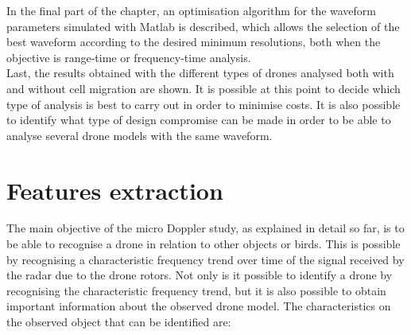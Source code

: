 In the final part of the chapter, an optimisation algorithm for the waveform parameters simulated with Matlab is described, which allows the selection of the best waveform according to the desired minimum resolutions, both when the objective is range-time or frequency-time analysis.\\
Last, the results obtained with the different types of drones analysed both with and without cell migration are shown. It is possible at this point to decide which type of analysis is best to carry out in order to minimise costs. It is also possible to identify what type of design compromise can be made in order to be able to analyse several drone models with the same waveform.

\section{Features extraction}
The main objective of the micro Doppler study, as explained in detail so far, is to be able to recognise a drone in relation to other objects or birds. This is possible by recognising a characteristic frequency trend over time of the signal received by the radar due to the drone rotors. Not only is it possible to identify a drone by recognising the characteristic frequency trend, but it is also possible to obtain important information about the observed drone model. The characteristics on the observed object that can be identified are:

